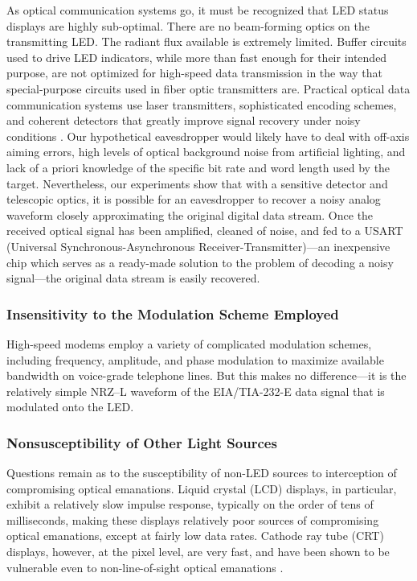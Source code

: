 \documentclass{acmtrans2e}
\begin{document}
As optical communication systems go, it must be recognized that LED
status displays are highly sub-optimal.  There are no beam-forming
optics on the transmitting LED.  The radiant flux available is
extremely limited.  Buffer circuits used to drive LED indicators, while 
more than fast enough for their intended purpose, are not optimized for 
high-speed data transmission in the way that special-purpose circuits 
used in fiber optic transmitters are.  Practical optical data 
communication systems use laser transmitters, sophisticated encoding 
schemes, and coherent detectors that greatly improve signal recovery 
under noisy conditions \cite{gagliardi}.  Our hypothetical eavesdropper 
would likely have to deal with off-axis aiming errors, high levels of 
optical background noise from artificial lighting, and lack of a
priori knowledge of the specific bit rate and word length used by the target.  
Nevertheless, our experiments show that with a sensitive detector and 
telescopic optics, it is possible for an eavesdropper to recover a noisy 
analog waveform closely approximating the original digital data stream.  
Once the received optical signal has been amplified, cleaned of noise, 
and fed to a USART (Universal Synchronous-Asynchronous
Receiver-Transmitter)---an inexpensive chip which serves as a ready-made
solution to the problem of decoding a noisy signal---the original data
stream is easily recovered.

\subsubsection{Insensitivity to the Modulation Scheme Employed}

High-speed modems employ a variety of complicated modulation schemes, including 
frequency, amplitude, and phase modulation to maximize available 
bandwidth on voice-grade telephone lines.  But this makes no
difference---it is the relatively simple NRZ--L waveform of the
EIA/TIA-232-E data signal that is modulated onto the LED.

\subsubsection{Nonsusceptibility of Other Light Sources}

Questions remain as to the susceptibility of non-LED sources to
interception of compromising optical emanations.  Liquid crystal
(LCD) displays, in particular, exhibit a relatively slow impulse
response, typically on the order of tens of milliseconds, making
these displays relatively poor sources of compromising optical
emanations, except at fairly low data rates.  Cathode ray tube
(CRT) displays, however, at the pixel level, are very fast, and
have been shown to be vulnerable even to non-line-of-sight optical
emanations \cite{markus}.
\end{document}

